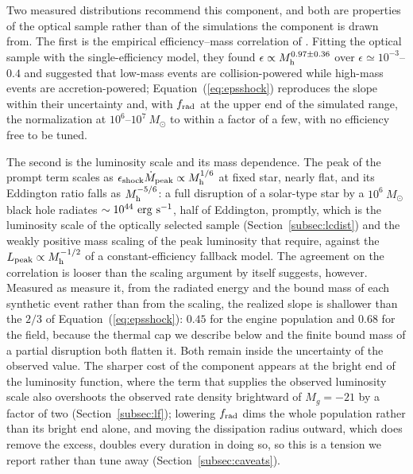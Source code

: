 \documentclass[twocolumn,pdftex]{aastex701}
\newcommand{\msun}{M_{\odot}\xspace}
\begin{document}
Two measured distributions recommend this component, and both are properties of the optical sample rather than of the simulations the component is drawn from. The first is the empirical efficiency--mass correlation of \citet{Nicholl:2022a}. Fitting the optical sample with the single-efficiency model, they found $\epsilon \propto M_{\rm h}^{0.97 \pm 0.36}$ over $\epsilon \simeq 10^{-3}$--$0.4$ and suggested that low-mass events are collision-powered while high-mass events are accretion-powered; Equation~(\ref{eq:epsshock}) reproduces the slope within their uncertainty and, with $f_{\rm rad}$ at the upper end of the simulated range, the normalization at $10^{6}$--$10^{7}~\msun$ to within a factor of a few, with no efficiency free to be tuned.

The second is the luminosity scale and its mass dependence. The peak of the prompt term scales as $\epsilon_{\rm shock} \dot{M}_{\rm peak} \propto M_{\rm h}^{1/6}$ at fixed star, nearly flat, and its Eddington ratio falls as $M_{\rm h}^{-5/6}$: a full disruption of a solar-type star by a $10^{6}~\msun$ black hole radiates $\sim 10^{44}~{\rm erg~s^{-1}}$, half of Eddington, promptly, which is the luminosity scale of the optically selected sample (Section~\ref{subsec:lcdist}) and the weakly positive mass scaling of the peak luminosity that \citet{Mummery:2025b} require, against the $L_{\rm peak} \propto M_{\rm h}^{-1/2}$ of a constant-efficiency fallback model. The agreement on the correlation is looser than the scaling argument by itself suggests, however. Measured as \citeauthor{Nicholl:2022a} measure it, from the radiated energy and the bound mass of each synthetic event rather than from the scaling, the realized slope is shallower than the $2/3$ of Equation~(\ref{eq:epsshock}): $0.45$ for the engine population and $0.68$ for the field, because the thermal cap we describe below and the finite bound mass of a partial disruption both flatten it. Both remain inside the uncertainty of the observed value. The sharper cost of the component appears at the bright end of the luminosity function, where the term that supplies the observed luminosity scale also overshoots the observed rate density brightward of $M_g = -21$ by a factor of two (Section~\ref{subsec:lf}); lowering $f_{\rm rad}$ dims the whole population rather than its bright end alone, and moving the dissipation radius outward, which does remove the excess, doubles every duration in doing so, so this is a tension we report rather than tune away (Section~\ref{subsec:caveats}).
\end{document}
